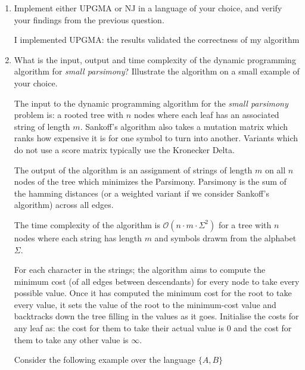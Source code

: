 \documentclass[10pt,\jkfside,a4paper]{article}
\begin{document}
\begin{enumerate}
\begin{itemize}
    \end{itemize}

    \item Implement either UPGMA or NJ in a language of your choice, and verify your findings from the previous question.

    I implemented UPGMA: the results validated the correctness of my algorithm

    

    \item What is the input, output and time complexity of the dynamic programming algorithm for \textit{small parsimony}? Illustrate the algorithm on a small example of your choice.

    The input to the dynamic programming algorithm for the \textit{small parsimony} problem is: a rooted tree with $n$ nodes where each leaf has an associated string of length $m$. Sankoff's algorithm also takes
    a mutation matrix which ranks how expensive it is for one symbol to turn into another. Variants which do not use a score matrix typically use the Kronecker Delta.

    The output of the algorithm is an assignment of strings of length $m$ on all $n$ nodes of the tree which minimizes the Parsimony. Parsimony is the sum of the hamming distances (or a weighted variant if we
    consider Sankoff's algorithm) across all edges.

    The time complexity of the algorithm is $\mathcal O(n \cdot m \cdot \Sigma^2)$ for a tree with $n$ nodes where each string has length $m$ and symbols drawm from the alphabet $\Sigma$.

    For each character in the strings; the algorithm aims to compute the minimum cost (of all edges between descendants) for every node to take every possible value. Once it has computed the minimum cost for the
    root to take every value, it sets the value of the root to the minimum-cost value and backtracks down the tree filling in the values as it goes. Initialise the costs for any leaf as: the cost for them to
    take their actual value is $0$ and the cost for them to take any other value is $\infty$.

    Consider the following example over the language $\{A, B\}$

    \begin{figure}[H]

        \centering

        \begin{tikzpicture}


\end{tikzpicture}
\end{figure}
\end{enumerate}
\end{document}
